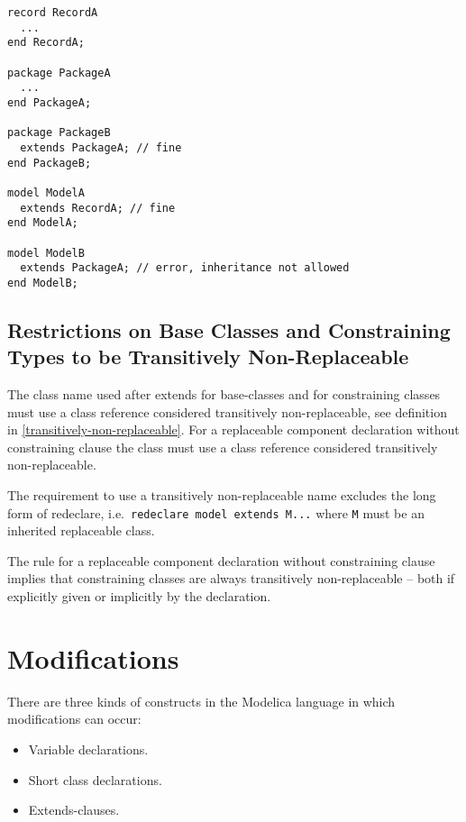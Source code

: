 \begin{example}
\begin{lstlisting}[language=modelica]
record RecordA
  ...
end RecordA;

package PackageA
  ...
end PackageA;

package PackageB
  extends PackageA; // fine
end PackageB;

model ModelA
  extends RecordA; // fine
end ModelA;

model ModelB
  extends PackageA; // error, inheritance not allowed
end ModelB;
\end{lstlisting}
\end{example}

\subsection{Restrictions on Base Classes and Constraining Types to be Transitively Non-Replaceable}\label{restrictions-on-base-classes-and-constraining-types-to-be-transitively-non-replaceable}

The class name used after extends for base-classes and for constraining
classes must use a class reference considered transitively
non-replaceable, see definition in \cref{transitively-non-replaceable}.
For a replaceable component declaration without constraining
clause the class must use a class reference considered transitively
non-replaceable.

\begin{nonnormative}
The requirement to use a transitively non-replaceable name excludes the long form of redeclare, i.e.\ \lstinline!redeclare model extends M...! where
\lstinline!M! must be an inherited replaceable class.
\end{nonnormative}

\begin{nonnormative}
The rule for a replaceable component declaration without constraining clause implies that constraining classes are always transitively non-replaceable -- both
if explicitly given or implicitly by the declaration.
\end{nonnormative}

\section{Modifications}\label{modifications}

There are three kinds of constructs in the Modelica language in which
modifications can occur:
\begin{itemize}
\item
  Variable declarations.
\item
  Short class declarations.
\item
  Extends-clauses.
\end{itemize}

